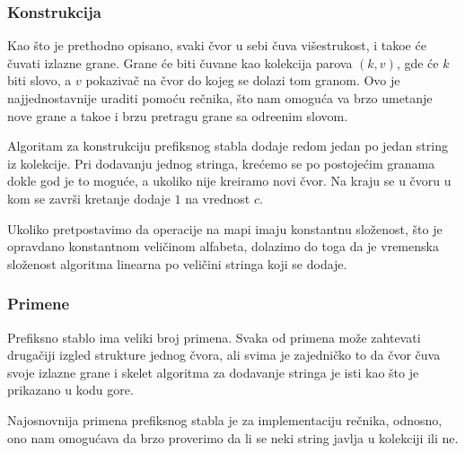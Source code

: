 \subsubsection{Konstrukcija}

Kao \v sto je prethodno opisano, svaki \v cvor u sebi \v cuva vi\v sestrukost, i tako\dj e \' ce \v cuvati izlazne grane. Grane \' ce biti \v cuvane kao kolekcija parova $(k, v)$, gde \' ce $k$ biti slovo, a $v$ pokaziva\v c na \v cvor do kojeg se dolazi tom granom. Ovo je najjednostavnije uraditi pomo\' cu re\v cnika, \v sto nam omogu\'ca va brzo umetanje nove grane a tako\dj e i brzu pretragu grane sa odre\dj enim slovom.



Algoritam za konstrukciju prefiksnog stabla dodaje redom jedan po jedan string iz kolekcije. Pri dodavanju jednog stringa, kre\' cemo se po postoje\' cim granama dokle god je to mogu\' ce, a ukoliko nije kreiramo novi \v cvor. Na kraju se u \v cvoru u kom se zavr\v si kretanje dodaje $1$ na vrednost $c$.



Ukoliko pretpostavimo da operacije na mapi imaju konstantnu slo\v zenost, \v sto je opravdano konstantnom veli\v cinom alfabeta, dolazimo do toga da je vremenska slo\v zenost algoritma linearna po veli\v cini stringa koji se dodaje.

\subsubsection{Primene}

Prefiksno stablo ima veliki broj primena. Svaka od primena mo\v ze zahtevati druga\v ciji izgled strukture jednog \v cvora, ali svima je zajedni\v cko to da \v cvor \v cuva svoje izlazne grane i skelet algoritma za dodavanje stringa je isti kao \v sto je prikazano u kodu gore.

Najosnovnija primena prefiksnog stabla je za implementaciju re\v cnika, odnosno, ono nam omogu\' cava da brzo proverimo da li se neki string javlja u kolekciji ili ne.



